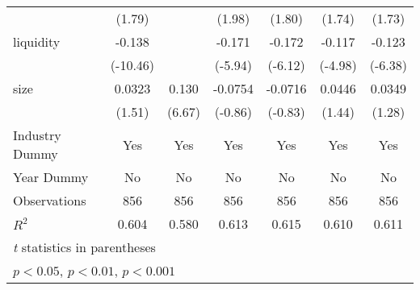 {\begin{tabular}{l*{6}{c}}
            &      (1.79)         &                     &      (1.98)         &      (1.80)         &      (1.74)         &      (1.73)         \\
[1em]
liquidity   &      -0.138\sym{***}&                     &      -0.171\sym{**} &      -0.172\sym{**} &      -0.117\sym{**} &      -0.123\sym{**} \\
            &    (-10.46)         &                     &     (-5.94)         &     (-6.12)         &     (-4.98)         &     (-6.38)         \\
[1em]
size        &      0.0323         &       0.130\sym{**} &     -0.0754         &     -0.0716         &      0.0446         &      0.0349         \\
            &      (1.51)         &      (6.67)         &     (-0.86)         &     (-0.83)         &      (1.44)         &      (1.28)         \\
\hline
Industry Dummy&         Yes         &         Yes         &         Yes         &         Yes         &         Yes         &         Yes         \\
Year Dummy  &          No         &          No         &          No         &          No         &          No         &          No         \\
Observations&         856         &         856         &         856         &         856         &         856         &         856         \\
$ R^2 $     &       0.604         &       0.580         &       0.613         &       0.615         &       0.610         &       0.611         \\
\hline\hline
\multicolumn{7}{l}{\footnotesize \textit{t} statistics in parentheses}\\
\multicolumn{7}{l}{\footnotesize \sym{*} \(p<0.05\), \sym{**} \(p<0.01\), \sym{***} \(p<0.001\)}\\
\end{tabular}
}
